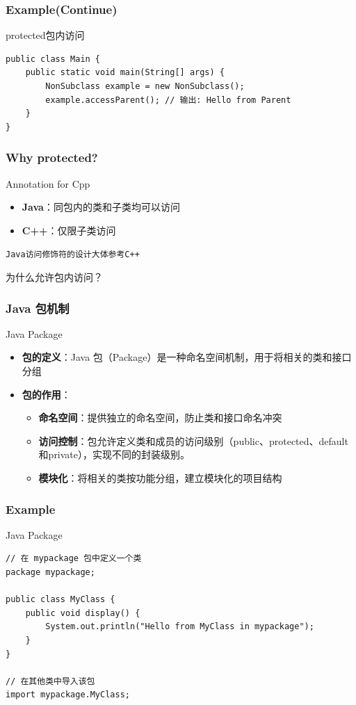 \documentclass[UTF8, 16pt]{beamer}
\begin{document}
\begin{frame}[fragile]
    \frametitle{Example(Continue)}
    \textcolor{sufered}{protected包内访问}

    \begin{lstlisting}
public class Main {
    public static void main(String[] args) {
        NonSubclass example = new NonSubclass();
        example.accessParent(); // 输出: Hello from Parent
    }
}
    \end{lstlisting}
\end{frame}

\begin{frame}
    \frametitle{Why protected?}
    \textcolor{sufered}{Annotation for Cpp}

    \begin{itemize}
        \item \textbf{Java}：同包内的类和子类均可以访问
        \item \textbf{C++}：仅限子类访问
    \end{itemize}

    \texttt{Java访问修饰符的设计大体参考C++}

    \textcolor{sufered}{为什么允许包内访问？}
\end{frame}

\begin{frame}[fragile]
    \frametitle{Java 包机制}
    \textcolor{sufered}{Java Package}

    \begin{itemize}
        \item \textbf{包的定义}：Java 包（Package）是一种命名空间机制，用于将相关的类和接口分组

        \item \textbf{包的作用}：
              \begin{itemize}
                  \item \textbf{命名空间}：提供独立的命名空间，防止类和接口命名冲突
                  \item \textbf{访问控制}：包允许定义类和成员的访问级别（public、protected、default和private），实现不同的封装级别。
                  \item \textbf{模块化}：将相关的类按功能分组，建立模块化的项目结构
              \end{itemize}
    \end{itemize}
\end{frame}

\begin{frame}[fragile]
    \frametitle{Example}
    \textcolor{sufered}{Java Package}
    \begin{lstlisting}
// 在 mypackage 包中定义一个类
package mypackage;

public class MyClass {
    public void display() {
        System.out.println("Hello from MyClass in mypackage");
    }
}

// 在其他类中导入该包
import mypackage.MyClass;
    \end{lstlisting}
\end{frame}
\end{document}
